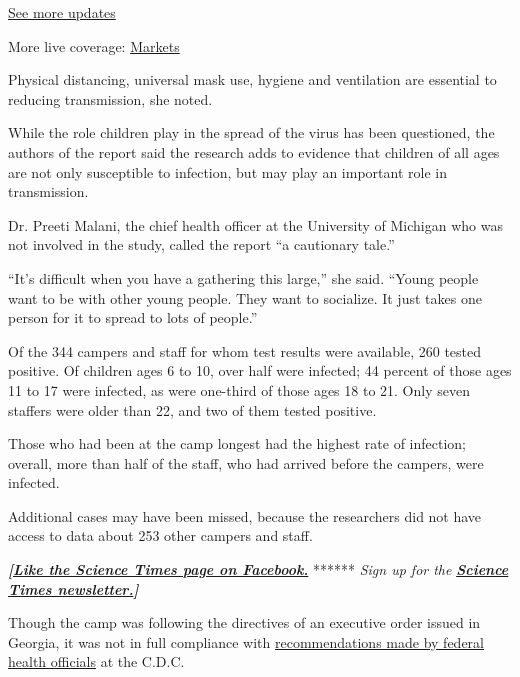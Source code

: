 \href{https://www.nytimes.com/2020/08/01/world/coronavirus-covid-19.html?action=click\&pgtype=Article\&state=default\&region=MAIN_CONTENT_1\&context=storylines_live_updates}{See
more updates}

More live coverage:
\href{https://www.nytimes.com/live/2020/07/31/business/stock-market-today-coronavirus?action=click\&pgtype=Article\&state=default\&region=MAIN_CONTENT_1\&context=storylines_live_updates}{Markets}

Physical distancing, universal mask use, hygiene and ventilation are
essential to reducing transmission, she noted.

While the role children play in the spread of the virus has been
questioned, the authors of the report said the research adds to evidence
that children of all ages are not only susceptible to infection, but may
play an important role in transmission.

Dr. Preeti Malani, the chief health officer at the University of
Michigan who was not involved in the study, called the report ``a
cautionary tale.''

``It's difficult when you have a gathering this large,'' she said.
``Young people want to be with other young people. They want to
socialize. It just takes one person for it to spread to lots of
people.''

Of the 344 campers and staff for whom test results were available, 260
tested positive. Of children ages 6 to 10, over half were infected; 44
percent of those ages 11 to 17 were infected, as were one-third of those
ages 18 to 21. Only seven staffers were older than 22, and two of them
tested positive.

Those who had been at the camp longest had the highest rate of
infection; overall, more than half of the staff, who had arrived before
the campers, were infected.

Additional cases may have been missed, because the researchers did not
have access to data about 253 other campers and staff.

\textbf{\emph{{[}}\href{http://on.fb.me/1paTQ1h}{\emph{Like the Science
Times page on Facebook.}}} ****** \emph{\textbar{} Sign up for the}
\textbf{\href{http://nyti.ms/1MbHaRU}{\emph{Science Times
newsletter.}}\emph{{]}}}

Though the camp was following the directives of an executive order
issued in Georgia, it was not in full compliance with
\href{https://www.cdc.gov/coronavirus/2019-ncov/community/schools-childcare/summer-camps.html}{recommendations
made by federal health officials} at the C.D.C.

